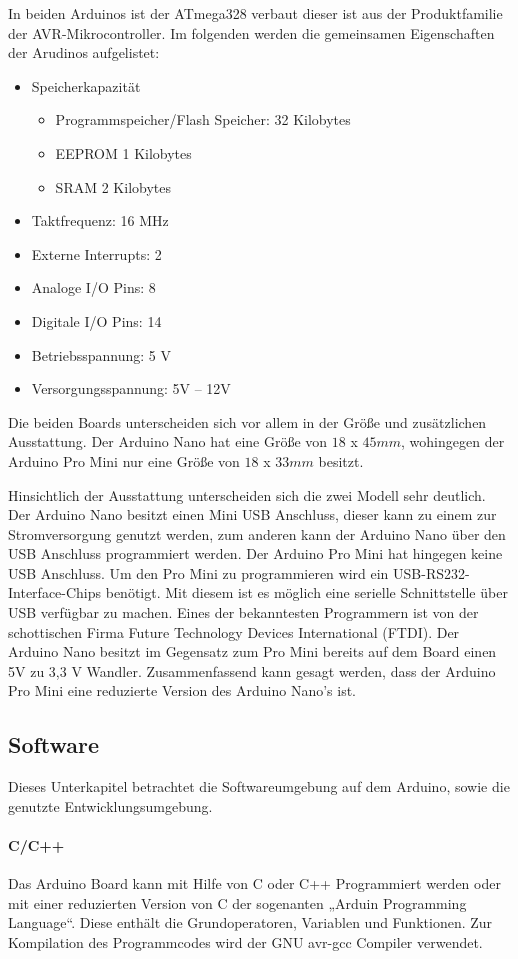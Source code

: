 In beiden Arduinos ist der ATmega328 verbaut dieser ist aus der Produktfamilie der AVR-Mikrocontroller. Im folgenden werden die gemeinsamen Eigenschaften der Arudinos aufgelistet: 
\begin{itemize}
	\item Speicherkapazität
	\begin{itemize}
		\item Programmspeicher/Flash Speicher: 32 Kilobytes
		\item EEPROM 1 Kilobytes
		\item SRAM 2 Kilobytes
	\end{itemize}
	\item Taktfrequenz: 16 MHz
	\item Externe Interrupts: 2
	\item Analoge I/O Pins: 8
	\item Digitale I/O Pins: 14
	\item Betriebsspannung: 5 V
	\item Versorgungsspannung: 5V – 12V
\end{itemize}
Die beiden Boards unterscheiden sich vor allem in der Größe und zusätzlichen Ausstattung.  Der Arduino Nano hat eine Größe von $18$ x $45 mm$, wohingegen der Arduino Pro Mini nur eine Größe von $18$ x $33 mm$ besitzt.

Hinsichtlich der Ausstattung unterscheiden sich die zwei Modell  sehr deutlich. Der Arduino Nano besitzt einen Mini USB Anschluss, dieser kann zu einem zur Stromversorgung genutzt werden, zum anderen kann der Arduino Nano über den USB Anschluss programmiert werden. Der Arduino Pro Mini hat hingegen keine USB Anschluss. Um den Pro Mini zu programmieren wird ein USB-RS232-Interface-Chips benötigt. Mit diesem ist es möglich eine serielle Schnittstelle über USB verfügbar zu machen. Eines der bekanntesten Programmern ist von der schottischen Firma Future Technology Devices International (FTDI). Der Arduino Nano besitzt im Gegensatz zum Pro Mini bereits auf dem Board einen 5V zu 3,3 V Wandler. Zusammenfassend kann gesagt werden, dass der Arduino Pro Mini eine reduzierte Version des Arduino Nano’s ist.  


\subsection{Software}
Dieses Unterkapitel betrachtet die Softwareumgebung auf dem Arduino, sowie die genutzte Entwicklungsumgebung.
\paragraph{C/C++} Das Arduino Board kann mit Hilfe von C oder C++ Programmiert werden oder mit einer reduzierten Version von C der sogenanten „Arduin Programming Language“. Diese enthält die Grundoperatoren, Variablen und Funktionen.  Zur Kompilation des  Programmcodes wird  der GNU avr-gcc Compiler verwendet. 

